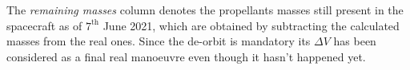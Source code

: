 The \textit{remaining masses} column denotes the propellants masses still present in the spacecraft as of $7^{\textrm{th}}$ June 2021, which are obtained by subtracting the calculated masses from the real ones. Since the de-orbit is mandatory its $\Delta V$ has been considered as a final real manoeuvre even though it hasn't happened yet.